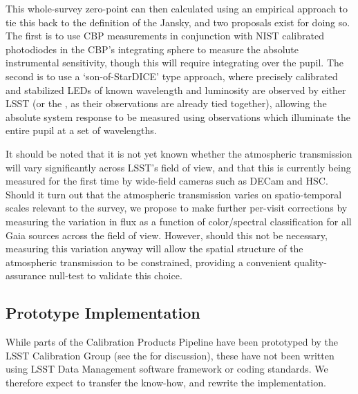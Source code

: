 This whole-survey zero-point can then calculated using an empirical approach to tie this back to the definition of the Jansky, and two proposals exist for doing so. The first is to use CBP measurements in conjunction with NIST calibrated photodiodes in the CBP's integrating sphere to measure the absolute instrumental sensitivity, though this will require integrating over the pupil. The second is to use a `son-of-StarDICE' type approach, where precisely calibrated and stabilized LEDs of known wavelength and luminosity are observed by either LSST (or the \auxtelescope, as their observations are already tied together), allowing the absolute system response to be measured using observations which illuminate the entire pupil at a set of wavelengths.
















It should be noted that it is not yet known whether the atmospheric transmission will vary significantly across LSST's field of view, and that this is currently being measured for the first time by wide-field cameras such as DECam and HSC. Should it turn out that the atmospheric transmission varies on spatio-temporal scales relevant to the survey, we propose to make further per-visit corrections by measuring the variation in flux as a function of color/spectral classification for all Gaia sources across the field of view. However, should this not be necessary, measuring this variation anyway will allow the spatial structure of the atmospheric transmission to be constrained, providing a convenient quality-assurance null-test to validate this choice.









\subsection{Prototype Implementation}
\label{sec:CPP:prototypeImplementation}
While parts of the Calibration Products Pipeline have been prototyped by the LSST Calibration Group (see the \NewPCP for discussion), these have not been written using LSST Data Management software framework or coding standards. We therefore expect to transfer the know-how, and rewrite the implementation.











